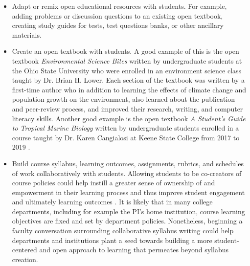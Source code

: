 \documentclass[11pt]{article}
\begin{document}
\begin{itemize}
  \item Adapt or remix open educational resources with students. For example, adding problems or discussion questions to an existing open textbook, creating study guides for tests, test questions banks, or other ancillary materials.
  
  \item Create an open textbook with students.  A good example of this is the open textbook \textit{Environmental Science Bites} written by undergraduate students at the Ohio State University \cite{KC-TS-BL:nd} who were enrolled in an environment science class taught by Dr. Brian H. Lower.  Each section of the textbook was written by a first-time author who in addition to learning the effects of climate change and population growth on the environment, also learned about the publication and peer-review process, and improved their research, writing, and computer literacy skills.  Another good example is the open textbook \textit{A Student's Guide to Tropical Marine Biology} written by undergraduate students enrolled in a course taught by Dr. Karen Cangialosi at Keene State College from 2017 to 2019 \cite{HZ-AB-AO:nd}.

  \item Build course syllabus, learning outcomes, assignments, rubrics, and schedules of work collaboratively with students. Allowing students to be co-creators of course policies could help instill a greater sense of ownership of and empowerment in their learning process and thus improve student engagement and ultimately learning outcomes \cite{DW:13, DW-JH:18}. It is likely that in many college departments, including for example the PI's home institution, course learning objectives are fixed and set by department policies.  Nonetheless, beginning a faculty conversation surrounding collaborative syllabus writing could help departments and institutions plant a seed towards building a more student-centered and open approach to learning that permeates beyond syllabus creation.
  

\end{itemize}
\end{document}

